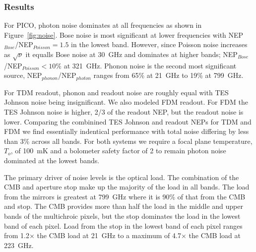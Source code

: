 \documentclass[]{spie}  %
\begin{document}
\subsubsection{Results}  %

For PICO, photon noise dominates at all frequencies as shown in Figure~\ref{fig:noise}. Bose noise is most significant 
at lower frequencies with NEP$_{Bose}$/NEP$_{Poisson}= 1.5 $ in the lowest band.  However, since Poisson noise increases as 
$\sqrt{\nu}$ it equalls Bose noise at 30~GHz and dominates at higher bands; NEP$_{Bose}$/NEP$_{Poisson} <10\%$ at 321~GHz. 
Phonon noise is the second most significant source, NEP$_{phonon}$/NEP$_{photon}$ ranges from 65\% at 21~GHz 
to 19\% at 799~GHz. 

For TDM readout, phonon and readout noise are roughly equal with TES Johnson noise being insignificant.  We also modeled 
FDM readout.  For FDM the TES Johnson noise is higher, 2/3 of the readout NEP, but the readout 
noise is lower.  Comparing the combinined TES Johnson and readout NEPs for TDM and FDM we find essentially indentical performance 
with total noise differing by less than 3\% across all bands.  For both systems we require a focal plane temperature, $T_o$, of 
100~mK and a bolometer safety factor of 2 to remain photon noise dominated at the lowest bands.

The primary driver of noise levels is the optical load.  The combination of the CMB and aperture stop make up the majority of the load in all bands.
The load from the mirrors is greatest at 799~GHz where it is 90\% of that from the CMB and stop. The CMB provides more than half the load 
in the middle and upper bands of the multichroic pixels, but the stop dominates the load in the lowest band of each pixel.  Load from the 
stop in the lowest band of each pixel ranges from 1.2$\times$ the CMB load at 21~GHz to a maximum of 4.7$\times$ the CMB load at 223~GHz. 


\end{document}
